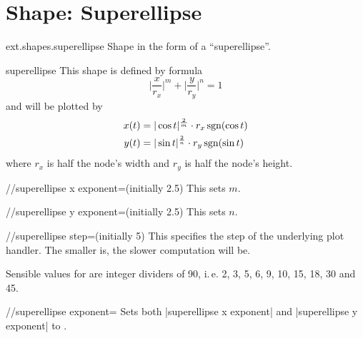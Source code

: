 %
%
%

\section{Shape: Superellipse}
\begin{pgflibrary}{ext.shapes.superellipse}
  Shape in the form of a ``superellipse''.
\end{pgflibrary}

\begin{ext_shape}{superellipse}
This shape is defined by formula
\begin{equation*}
  \biggl|\frac x{r_x}\biggr|^m + \biggl|\frac y{r_y}\biggr|^n = 1
\end{equation*}
and will be plotted by
\begin{align*}
  x(t) &= |\cos t|^{\frac 2m} \cdot r_x \operatorname{sgn}(\cos t) \\
  y(t) &= |\sin t|^{\frac 2n} \cdot r_y \operatorname{sgn}(\sin t) \\
\end{align*}
where $r_x$ is half the node's width and $r_y$ is half the node's height.

\begin{key}{/\pgfext/superellipse x exponent=(initially 2.5)}
This sets $m$.
\end{key}
\begin{key}{/\pgfext/superellipse y exponent=(initially 2.5)}
This sets $n$.
\end{key}
\begin{key}{/\pgfext/superellipse step=(initially 5)}
This specifies the step of the underlying plot handler.
The smaller  is, the slower computation will be.

Sensible values for  are integer dividers of 90, i.\,e.
2, 3, 5, 6, 9, 10, 15, 18, 30 and 45.
\end{key}
\begin{key}{/\pgfext/superellipse exponent=}
  Sets both |superellipse x exponent| and |superellipse y exponent| to .
\end{key}


\end{ext_shape}
